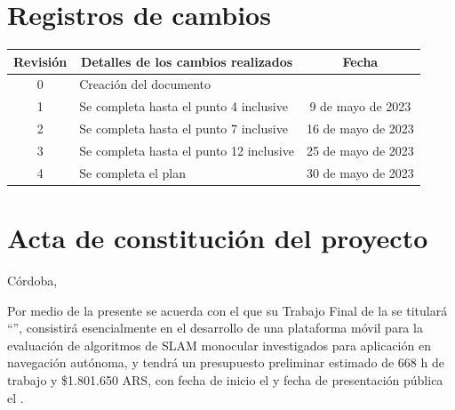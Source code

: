 \documentclass[
11pt, %
codirector, %
]{charter}
\begin{document}
\maketitle
\thispagestyle{empty}
\pagebreak


\thispagestyle{empty}
{\setlength{\parskip}{0pt}
\setcounter{tocdepth}{1}
\tableofcontents{}
}
\pagebreak


\section*{Registros de cambios}
\label{sec:registro}


\begin{table}[ht]
\label{tab:registro}
\centering
\begin{tabularx}{\linewidth}{@{}|c|X|c|@{}}
\hline
\rowcolor[HTML]{C0C0C0}
Revisión & \multicolumn{1}{c|}{\cellcolor[HTML]{C0C0C0}Detalles de los cambios realizados} & Fecha      \\ \hline
0      & Creación del documento                                 &\fechaInicioName 	 \\ \hline
1      & Se completa hasta el punto 4 inclusive                 & 9 de mayo de 2023  \\ \hline
2      & Se completa hasta el punto 7 inclusive					& 16 de mayo de 2023 \\ \hline
3      & Se completa hasta el punto 12 inclusive                & 25 de mayo de 2023 \\ \hline
4      & Se completa el plan	                                & 30 de mayo de 2023 \\ \hline
\end{tabularx}
\end{table}

\pagebreak



\section*{Acta de constitución del proyecto}
\label{sec:acta}

\begin{flushright}
Córdoba, \fechaInicioName
\end{flushright}

\vspace{2cm}

Por medio de la presente se acuerda con el \authorname\hspace{1px} que su Trabajo Final de la \degreename\hspace{1px} se titulará ``\ttitle'', consistirá esencialmente en el desarrollo de una plataforma móvil para la evaluación de algoritmos de SLAM monocular investigados para aplicación en navegación autónoma, y tendrá un presupuesto preliminar estimado de 668 h de trabajo y \$1.801.650 ARS, con fecha de inicio el \fechaInicioName\hspace{1px} y fecha de presentación pública el \fechaFinalName.
\end{document}
